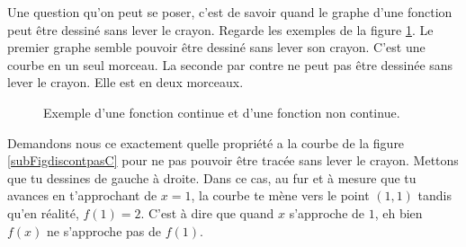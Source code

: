 Une question qu'on peut se poser, c'est de savoir quand le graphe d'une fonction peut être dessiné sans lever le crayon. Regarde les exemples de la figure \ref{FigUncontDeuxpasC}. Le premier graphe semble pouvoir être dessiné sans lever son crayon. C'est une courbe en un seul morceau. La seconde par contre ne peut pas être dessinée sans lever le crayon. Elle est en deux morceaux.
\begin{figure}[ht] 
\centering
{}
%
%
\caption{Exemple d'une fonction continue et d'une fonction non continue.}\label{FigUncontDeuxpasC}
\end{figure}

Demandons nous ce exactement quelle propriété a la courbe de la figure \ref{subFigdiscontpasC} pour ne pas pouvoir être tracée sans lever le crayon. Mettons que tu dessines de gauche à droite. Dans ce cas, au fur et à mesure que tu avances en t'approchant de $x=1$, la courbe te mène vers le point $(1,1)$ tandis qu'en réalité, $f(1)=2$. C'est à dire que quand $x$ s'approche de $1$, eh bien $f(x)$ ne s'approche pas de $f(1)$.

